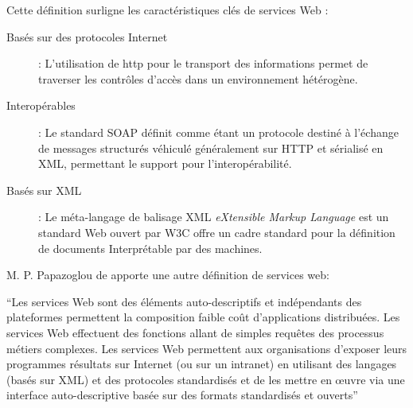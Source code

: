 Cette définition surligne les caractéristiques clés de services Web
\cite{fremantle2002enterprise}:

\renewcommand{\descriptionlabel}[1]{\hspace{0.5cm}\textbullet~\textsf{#1}}
\begin{description}
\item[Basés sur des protocoles Internet]: L'utilisation de
  \acrshort{http} pour le transport des informations permet de
  traverser les contrôles d'accès dans un environnement hétérogène.

\item[Interopérables]: Le standard \textsc{SOAP} \cite{box2000simple}
  définit comme étant un protocole destiné à l'échange de messages
  structurés véhiculé généralement sur \textsc{HTTP} et sérialisé en
  \textsc{XML}, permettant le support pour l'interopérabilité.

\item[Basés sur XML] : Le méta-langage de balisage \textsc{XML}
  \textit{eXtensible Markup Language} est un standard Web ouvert par
  \textsc{W3C} \cite{bray1998extensible} offre un cadre standard pour
  la définition de documents Interprétable par des machines.
\end{description}
\enddescription

M. P. Papazoglou \cite{papazoglou2003service} de apporte une
autre définition de services web:

\begin{mydef} 
``Les services Web sont des éléments auto-descriptifs et
  indépendants des plateformes permettent la composition faible coût
  d’applications distribuées. Les services Web effectuent des
  fonctions allant de simples requêtes des processus métiers
  complexes. Les services Web permettent aux organisations d’exposer
  leurs programmes résultats sur Internet (ou sur un intranet) en
  utilisant des langages (basés sur XML) et des protocoles
  standardisés et de les mettre en œuvre via une interface
  auto-descriptive basée sur des formats standardisés et ouverts''
\end{mydef}


% 
\newpage
